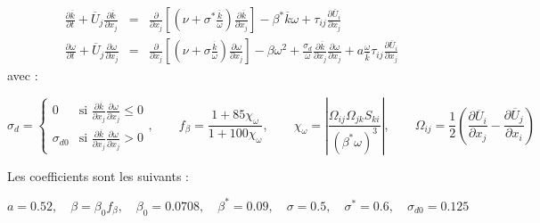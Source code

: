 \begin{eqnarray*}
\frac{\partial\overline{k}}{\partial t}+\overline{U}_{j}\frac{\partial\overline{k}}{\partial x_{j}} & = & \frac{\partial}{\partial x_{j}}\left[\left(\nu+\sigma^{*}\frac{\overline{k}}{\omega}\right)\frac{\partial\overline{k}}{\partial x_{j}}\right]-\beta^{*}\overline{k}\omega+\tau_{ij}\frac{\partial\overline{U}_{i}}{\partial x_{j}}\\
\frac{\partial\omega}{\partial t}+\overline{U}_{j}\frac{\partial\omega}{\partial x_{j}} & = & \frac{\partial}{\partial x_{j}}\left[\left(\nu+\sigma\frac{\overline{k}}{\omega}\right)\frac{\partial\omega}{\partial x_{j}}\right]-\beta\omega^{2}+\frac{\sigma_{d}}{\omega}\frac{\partial\overline{k}}{\partial x_{j}}\frac{\partial\omega}{\partial x_{j}}+a\frac{\omega}{\overline{k}}\tau_{ij}\frac{\partial\overline{U}_{i}}{\partial x_{j}}
\end{eqnarray*}
avec :

\[
\sigma_{d}=\begin{cases}
0 & \mbox{si }\frac{\partial\overline{k}}{\partial x_{j}}\frac{\partial\omega}{\partial x_{j}}\leq0\\
\sigma_{d0} & \mbox{si }\frac{\partial\overline{k}}{\partial x_{j}}\frac{\partial\omega}{\partial x_{j}}>0
\end{cases},\qquad f_{\beta}=\frac{1+85\chi_{\omega}}{1+100\chi_{\omega}},\qquad\chi_{\omega}=\left|\frac{\Omega_{ij}\Omega_{jk}S_{ki}}{(\beta^{*}\omega)^{3}}\right|,\qquad\Omega_{ij}=\frac{1}{2}\left(\frac{\partial\overline{U}_{i}}{\partial x_{j}}-\frac{\partial\overline{U}_{j}}{\partial x_{i}}\right)
\]


Les coefficients sont les suivants :

\[
a=0.52,\quad\beta=\beta_{0}f_{\beta},\quad\beta_{0}=0.0708,\quad\beta^{*}=0.09,\quad\sigma=0.5,\quad\sigma^{*}=0.6,\quad\sigma_{d0}=0.125
\]


